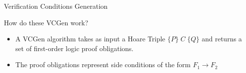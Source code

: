 \documentclass[aspectratio=169]{beamer}
\begin{document}

%


\begin{slide}{Verification Conditions Generation}

\begin{block}{How do these VCGen work?}
\begin{itemize}
\item A VCGen algorithm takes as input a Hoare Triple $\{P\}\;C\;\{Q\}$ and returns a set of first-order logic proof obligations. 
\item The proof obligations represent side conditions of the form $F_1 \to F_2$ 
\end{itemize}
\end{block}
\end{slide}
\end{document}
